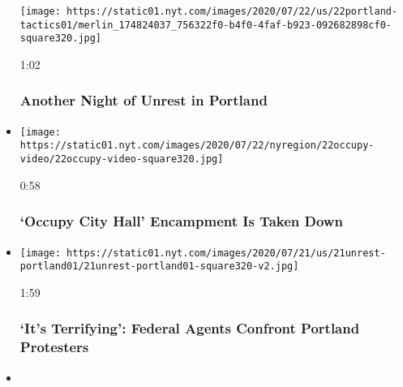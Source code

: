 \begin{itemize}
  \texttt{[image: https://static01.nyt.com/images/2020/07/22/us/22portland-tactics01/merlin\_174824037\_756322f0-b4f0-4faf-b923-092682898cf0-square320.jpg]}

  1:02

  \hypertarget{another-night-of-unrest-in-portland}{%
  \subsubsection{Another Night of Unrest in
  Portland}\label{another-night-of-unrest-in-portland}}
\item
  \href{https://www.nytimes.com/video/us/politics/100000007250886/occupy-city-hall-new-york.html?action=click\&module=video-series-bar\&region=header\&pgtype=Article\&playlistId=video/minneapolis-george-floyd-death-video}{}

  \texttt{[image: https://static01.nyt.com/images/2020/07/22/nyregion/22occupy-video/22occupy-video-square320.jpg]}

  0:58

  \hypertarget{occupy-city-hall-encampment-is-taken-down}{%
  \subsubsection{`Occupy City Hall' Encampment Is Taken
  Down}\label{occupy-city-hall-encampment-is-taken-down}}
\item
  \href{https://www.nytimes.com/video/us/100000007248945/portland-protests-federal-agents.html?action=click\&module=video-series-bar\&region=header\&pgtype=Article\&playlistId=video/minneapolis-george-floyd-death-video}{}

  \texttt{[image: https://static01.nyt.com/images/2020/07/21/us/21unrest-portland01/21unrest-portland01-square320-v2.jpg]}

  1:59

  \hypertarget{its-terrifying-federal-agents-confront-portland-protesters}{%
  \subsubsection{`It's Terrifying': Federal Agents Confront Portland
  Protesters}\label{its-terrifying-federal-agents-confront-portland-protesters}}
\item
  \href{https://www.nytimes.com/video/us/politics/100000007248877/dozens-of-moms-join-protest-in-portland.html?action=click\&module=video-series-bar\&region=header\&pgtype=Article\&playlistId=video/minneapolis-george-floyd-death-video}{}


\end{itemize}
